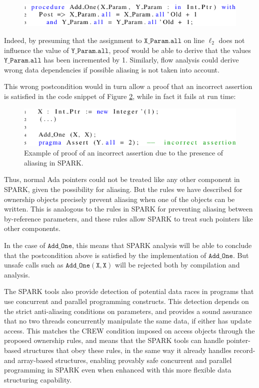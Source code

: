 \documentclass{llncs}
\newcommand\var[1]{\ensuremath{\mathtt{#1}}}
\begin{document}
\begin{figure}[htb!]
\centering
  \captionsetup{justification=centering,margin=0.6cm}
   \includegraphics[]{spark_ex1_proof}
   \label{fig:spark_ex1_proof}
\end{figure}

Indeed, by presuming that the assignment to \var{X\_Param.all} on line $\ell_2$ does not influence the value of \var{Y\_Param.all}, proof would be able to
derive that the values \var{Y\_Param.all} has been incremented by 1. Similarly, flow analysis could derive wrong data dependencies if possible aliasing is not taken into account.

This wrong postcondition would in turn allow a proof that an incorrect assertion is satisfied in the code snippet of Figure \ref{fig:spark_ex1_exp}, while in fact it fails at run time:

\begin{figure}[htb!]
\centering
  \captionsetup{justification=centering,margin=0.6cm}
   \includegraphics[]{spark_ex1_exp}
	\caption{Example of proof of an incorrect assertion due to the presence of aliasing in SPARK.}
   \label{fig:spark_ex1_exp}
\end{figure}

Thus, normal Ada pointers could not be treated like any other component in SPARK, given the possibility
for aliasing. But the rules we have described for ownership objects precisely prevent
aliasing when one of the objects can be written. This is analogous to the rules in SPARK for preventing aliasing between by-reference parameters, and these rules allow SPARK to treat such pointers
like other components.

In the case of \var{Add\_One}, this means that SPARK analysis will be able to conclude that the postcondition above is satisfied by the implementation of \var{Add\_One}.
But unsafe calls such as \var{Add\_One(X,X)} will be rejected both by compilation and analysis.

The SPARK tools also provide detection of potential data races
in programs that use concurrent and parallel programming constructs.
This detection depends on the strict anti-aliasing conditions on parameters,
and provides a sound assurance that no two threads concurrently manipulate
the same data, if either has update access.  This matches the
CREW condition imposed on access objects through the proposed ownership
rules, and means that the SPARK tools can handle pointer-based structures that
obey these rules, in the
same way it already handles record- and array-based structures, enabling
provably safe concurrent and parallel programming in SPARK even when enhanced with
this more flexible data structuring capability.
\end{document}
